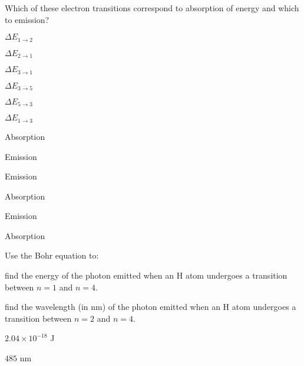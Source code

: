 \documentclass[main.tex]{subfiles}
\begin{document}
\begin{multicols*}{2}
\vspace{-0.0cm}\begin{question}[ID=\the\value{numA}]
Which of these electron transitions correspond to absorption of energy and which to emission?
\begin{enumerate}[label=(\alph*)]\begin{multicols*}{2}
\item $\Delta E_{1\rightarrow 2}$  %
\item $\Delta E_{2\rightarrow 1}$	%
\item $\Delta E_{3\rightarrow 1}$	%
\item  $\Delta E_{3\rightarrow 5}$	%
\item $\Delta E_{5\rightarrow 3}$	%
\item $\Delta E_{1\rightarrow 3}$	%
\end{multicols*}\end{enumerate}
\end{question}
\begin{solution}
\begin{inparaenum}[(a)]
\item  Absorption 
\item  Emission
\item  Emission
\item  Absorption
\item  Emission
\item  Absorption
\end{inparaenum}\hspace{0.1cm}\end{solution}

 
\vspace{-0.5cm}\begin{question}[ID=\the\value{numA}]
Use the Bohr equation to:
 \begin{inparaenum}[(a)]
\item   find the energy of the photon emitted when an H atom undergoes a transition between $n=1$ and $n=4$.
\item   find the wavelength (in nm) of the photon emitted when an H atom undergoes a transition between $n=2$ and $n=4$.
\end{inparaenum}
 \end{question}
\begin{solution}
\begin{inparaenum}[(a)]
\item   $2.04\times10^{-18}$ J
\item $485$ nm
\end{inparaenum}\hspace{0.1cm}\end{solution}


\end{multicols*}
\end{document}
